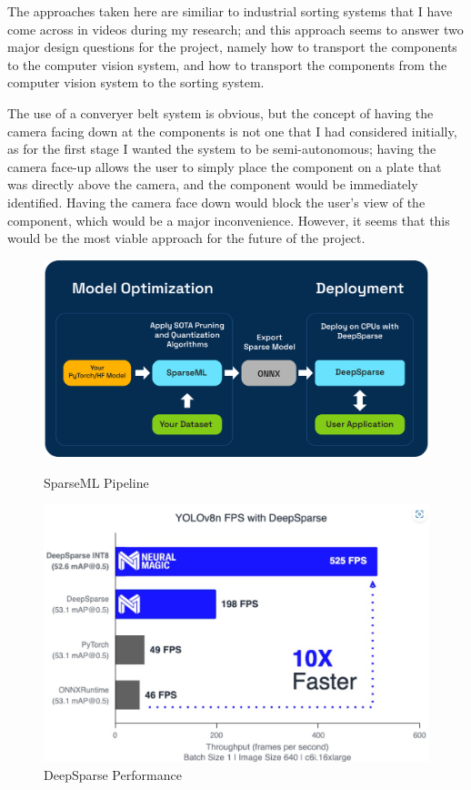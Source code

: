The approaches taken here are similiar to industrial sorting systems that I have come across in videos during my research; and this approach seems to answer two major design questions for the project, namely
how to transport the components to the computer vision system, and how to transport the components from the computer vision system to the sorting system.

The use of a converyer belt system is obvious, but the concept of having the camera facing down at the components is not one that I had considered initially, as for the first stage I wanted the system to be semi-autonomous;
having the camera face-up allows the user to simply place the component on a plate that was directly above the camera, and the component would be immediately identified. Having the camera face down
would block the user's view of the component, which would be a major inconvenience. However, it seems that this would be the most viable approach for the future of the project.

\begin{figure}[t]
  \begin{minipage}[t]{0.45\textwidth}
    \centering
    \includegraphics[width=\textwidth]{imgs/articles/sparseml-workflow.png}
    \caption{SparseML Pipeline \cite{sparseml}}
  \end{minipage}
  \hfill
  \begin{minipage}[t]{0.45\textwidth}
      \centering
      \includegraphics[width=\textwidth]{imgs/articles/yoloperf.jpg}
      \caption{DeepSparse Performance \cite{neuralmagic}}
      \end{minipage}
\end{figure}
